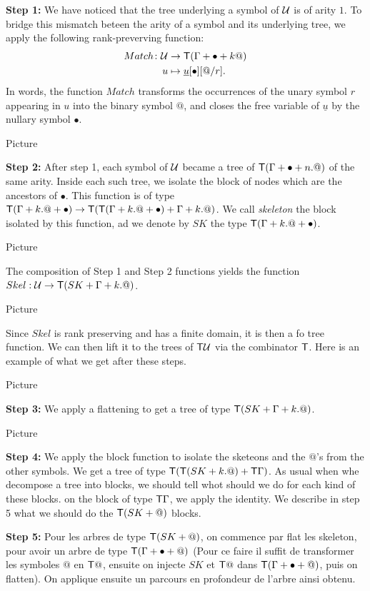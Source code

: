 \medskip
\noindent\textbf{Step 1:} We have noticed that the tree underlying a symbol of ${\mathcal U}$ is of arity $1$. To bridge this mismatch beteen the arity of a symbol and its underlying tree, we apply the following
rank-preverving function:
 \begin{align*}
  Match\colon {\mathcal U} &\to \mathsf T(\Gamma+\bullet+k@)\\
  u &\mapsto \underline{u}[\bullet][@/r].
\end{align*} 
In words, the function $Match$ transforms the occurrences of the unary symbol $r$ appearing in $u$ into the binary symbol $@$, and closes the free variable of $\underline{u}$ by the nullary symbol $\bullet$.
\begin{center}
Picture
\end{center}
\medskip
\textbf{Step 2:} After step 1, each symbol of ${\mathcal U}$ became a tree of $\mathsf T(\Gamma+\bullet+n.@)$ of the same arity. Inside each such tree, we isolate the block of nodes which are the ancestors of $\bullet$. This function is of type $\mathsf T(\Gamma+k.@+\bullet)\to \mathsf T (\mathsf T (\Gamma+k.@+\bullet)+\Gamma+k.@)$. We call \emph{skeleton} the block isolated by this function, ad we denote by 
$SK$ the type $\mathsf T (\Gamma+k.@+\bullet)$.
\begin{center}
Picture
\end{center}
The composition of Step 1 and Step 2 functions yields the function $Skel:{\mathcal U}\to \mathsf T (SK+\Gamma+k.@)$. 
\begin{center}
Picture
\end{center}
Since $Skel$ is rank preserving and has a finite domain, it is then a fo tree function. We can then lift it to the trees of $\mathsf T {\mathcal U}$ via the combinator $\mathsf T$. Here is an example of what we get after these steps.
\begin{center}
Picture
\end{center}
 \medskip
\textbf{Step 3:} We apply a flattening to get a tree of type $\mathsf T(SK+\Gamma+k.@)$. 
\begin{center}
Picture
\end{center}
\medskip
\textbf{Step 4:} We apply the block function to isolate the sketeons and the $@$'s from the other symbols. We get a tree of type $\mathsf T (\mathsf T(SK+k.@)+\mathsf T\Gamma)$. As usual when whe decompose a tree into blocks, we should tell whot should we do for each kind of these blocks. on the block of type $\mathsf T \Gamma$, we apply the identity. We describe in step 5 what we should do the $\mathsf T(SK+@)$ blocks.

\medskip
\noindent \textbf{Step 5:} Pour les arbres de type $\mathsf T (SK+@)$, on commence par flat les skeleton, pour avoir un arbre de type $\mathsf T(\Gamma+\bullet+@)$ (Pour ce faire il suffit de transformer les symboles $@$ en $\mathsf T @$, ensuite on injecte $SK$ et $\mathsf T @$ dans $\mathsf T(\Gamma+\bullet+@)$, puis on flatten).
On applique ensuite un parcours en profondeur de l'arbre ainsi obtenu.
 


